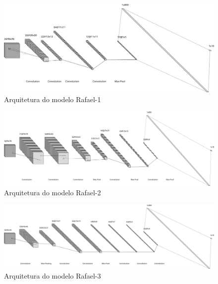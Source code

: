 \begin{figure}
	\caption {\label{cap_resultados_rafael_1}Arquitetura do modelo Rafael-1}
	\begin{center}
		\includegraphics[scale=0.50]{Imagens/arch-rafael-1}
	\end{center}
\end{figure}

\begin{figure}
	\caption {\label{cap_resultados_rafael_2}Arquitetura do modelo Rafael-2}
	\begin{center}
		\includegraphics[scale=0.50]{Imagens/arch-rafael-2}
	\end{center}
\end{figure}

\begin{figure}
	\caption {\label{cap_resultados_rafael_3}Arquitetura do modelo Rafael-3}
	\begin{center}
		\includegraphics[scale=0.50]{Imagens/arch-rafael-3}
	\end{center}
\end{figure}

